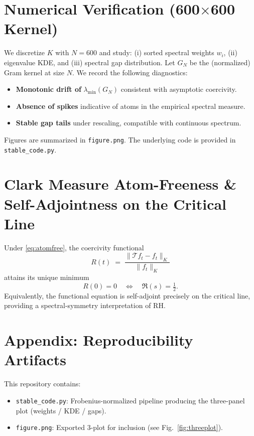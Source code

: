 \documentclass[11pt]{article}
\begin{document}
\section{Numerical Verification (600$\times$600 Kernel)}
We discretize $K$ with $N=600$ and study: (i) sorted spectral weights $w_i$, (ii) eigenvalue KDE, and (iii) spectral gap distribution.
Let $G_N$ be the (normalized) Gram kernel at size $N$. We record the following diagnostics:
\begin{itemize}
  \item \textbf{Monotonic drift of } $\lambda_{\min}(G_N)$ consistent with asymptotic coercivity.
  \item \textbf{Absence of spikes} indicative of atoms in the empirical spectral measure.
  \item \textbf{Stable gap tails} under rescaling, compatible with continuous spectrum.
\end{itemize}
Figures are summarized in \texttt{figure.png}. The underlying code is provided in \texttt{stable_code.py}.

\section{Clark Measure Atom-Freeness \& Self-Adjointness on the Critical Line}
Under \eqref{eq:atomfree}, the coercivity functional
\begin{equation}
R(t) \;=\; \frac{\|\mathcal{T}f_t - f_t\|_{K}}{\|f_t\|_{K}}
\end{equation}
attains its unique minimum
\begin{equation}
R(0)=0 \quad \Longleftrightarrow \quad \Re(s)=\tfrac{1}{2}.
\end{equation}
Equivalently, the functional equation is self-adjoint precisely on the critical line,
providing a spectral-symmetry interpretation of RH.

\section{Appendix: Reproducibility Artifacts}
This repository contains:
\begin{itemize}
  \item \texttt{stable_code.py}: Frobenius-normalized pipeline producing the three-panel plot (weights / KDE / gaps).
  \item \texttt{figure.png}: Exported 3-plot for inclusion (see Fig.~\ref{fig:threeplot}).
\end{itemize}
\end{document}
